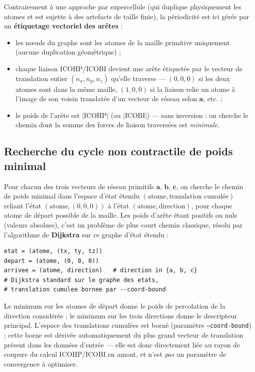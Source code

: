 \documentclass[11pt,a4paper]{article}
\begin{document}
Contrairement à une approche par supercellule (qui duplique physiquement
les atomes et est sujette à des artefacts de taille finie), la périodicité
est ici gérée par un \textbf{étiquetage vectoriel des arêtes} :

\begin{itemize}
  \item les n\oe uds du graphe sont les atomes de la maille primitive
    uniquement (aucune duplication géométrique) ;
  \item chaque liaison ICOHP/ICOBI devient une arête étiquetée par le
    vecteur de translation entier $(n_x, n_y, n_z)$ qu'elle traverse ---
    $(0,0,0)$ si les deux atomes sont dans la même maille, $(1,0,0)$ si la
    liaison relie un atome à l'image de son voisin translatée d'un vecteur
    de réseau selon $\mathbf{a}$, etc. ;
  \item le poids de l'arête est $|\text{ICOHP}|$ (ou $|\text{ICOBI}|$) ---
    sans inversion : on cherche le chemin dont la somme des forces de
    liaison traversées est \emph{minimale}.
\end{itemize}

\subsection{Recherche du cycle non contractile de poids minimal}

Pour chacun des trois vecteurs de réseau primitifs $\mathbf{a}$,
$\mathbf{b}$, $\mathbf{c}$, on cherche le chemin de poids minimal dans
l'espace d'état étendu $(\text{atome}, \text{translation cumulée})$ reliant
l'état $(\text{atome}, (0,0,0))$ à l'état $(\text{atome}, \text{direction})$,
pour chaque atome de départ possible de la maille. Les poids d'arête étant
positifs ou nuls (valeurs absolues), c'est un problème de plus court chemin
classique, résolu par l'algorithme de \textbf{Dijkstra} sur ce graphe
d'état étendu :

\begin{lstlisting}
etat = (atome, (tx, ty, tz))
depart = (atome, (0, 0, 0))
arrivee = (atome, direction)   # direction in {a, b, c}
# Dijkstra standard sur le graphe des etats,
# translation cumulee bornee par --coord-bound
\end{lstlisting}

Le minimum sur les atomes de départ donne le poids de percolation de la
direction considérée ; le minimum sur les trois directions donne le
descripteur principal. L'espace des translations cumulées est borné
(paramètre \texttt{--coord-bound}) ; cette borne est dérivée automatiquement
du plus grand vecteur de translation présent dans les données d'entrée ---
elle est donc directement liée au rayon de coupure du calcul ICOHP/ICOBI en
amont, et n'est \emph{pas} un paramètre de convergence à optimiser.
\end{document}
